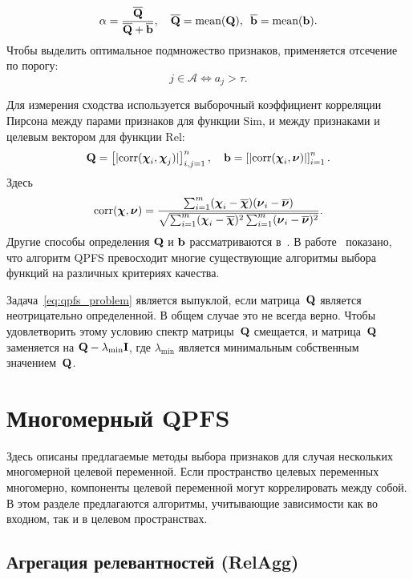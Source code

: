 \begin{equation*}
\alpha = \frac{\overline{\mathbf{Q}}}{\overline{\mathbf{Q}} + \overline{\mathbf{b}}}, \quad \overline{\mathbf{Q}} = \text{mean} (\mathbf{Q}), \,\,\, \overline{\mathbf{b}}= \text{mean} (\mathbf{b}).
\end{equation*}
Чтобы выделить оптимальное подмножество признаков, применяется отсечение по порогу:
\[
j \in \mathcal{A} \Leftrightarrow a_j > \tau.
\]

Для измерения сходства используется выборочный коэффициент корреляции Пирсона между парами признаков для функции Sim, и между признаками и целевым вектором для функции Rel:
\begin{equation}
\mathbf{Q} = \left[|\text{corr}(\boldsymbol{\chi}_i, \boldsymbol{\chi}_j)|\right]_{i,j=1}^n, \quad \mathbf{b} = \left[|\text{corr}(\boldsymbol{\chi}_i, \boldsymbol{\nu})|\right]_{i=1}^n.
\label{eq:qpfs_1d_qb}
\end{equation}
Здесь
\begin{equation*}
\text{corr}(\boldsymbol{\chi}, \boldsymbol{\nu}) = \frac{\sum_{i=1}^m(\boldsymbol{\chi}_i - \overline{\boldsymbol{\chi}})( \boldsymbol{\nu}_i - \overline{\boldsymbol{\nu}})}{\sqrt{\sum_{i=1}^m(\boldsymbol{\chi}_i - \overline{\boldsymbol{\chi}})^2\sum_{i=1}^m(\boldsymbol{\nu}_i - \overline{\boldsymbol{\nu}})^2}}.
\end{equation*}
Другие способы определения $\mathbf{Q}$ и $\mathbf{b}$ рассматриваются в~\cite{katrutsa2017comprehensive}. 
В работе~\cite{katrutsa2017comprehensive} показано, что алгоритм QPFS превосходит многие существующие алгоритмы выбора функций на различных критериях качества.

Задача~\eqref{eq:qpfs_problem} является выпуклой, если матрица~$\mathbf{Q}$ является неотрицательно определенной. В общем случае это не всегда верно. 
Чтобы удовлетворить этому условию спектр матрицы~$\mathbf{Q}$ смещается, и матрица~$\mathbf{Q}$ заменяется на $\mathbf{Q} - \lambda_{\text{min}} \mathbf{I}$, где $\lambda_{\text{min}} $ является минимальным собственным значением~$\mathbf{Q}$.

\section{Многомерный QPFS}

Здесь описаны предлагаемые методы выбора признаков для случая нескольких многомерной целевой переменной.
Если пространство целевых переменных многомерно, компоненты целевой переменной могут коррелировать между собой. 
В этом разделе предлагаются алгоритмы, учитывающие зависимости как во входном, так и в целевом пространствах.

\subsection{Агрегация релевантностей (RelAgg)}


